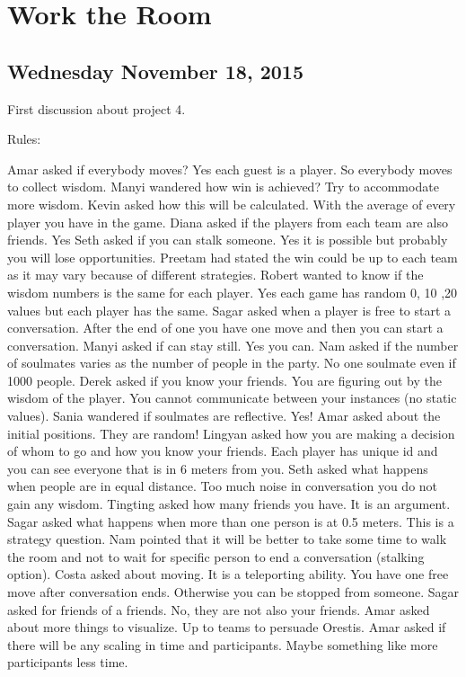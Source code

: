\section{Work the Room}
\subsection{Wednesday November 18, 2015}
First discussion about project 4.

Rules:

Amar asked if everybody moves? Yes each guest is a player. So everybody moves to 
collect wisdom.
Manyi wandered how win is achieved? Try to accommodate more wisdom.
Kevin asked how this will be calculated. With the average of every player you 
have in the game.
Diana asked if the players from each team are also friends. Yes
Seth asked if you can stalk someone. Yes it is possible but probably you will 
lose opportunities.
Preetam had stated the win could be up to each team as it may vary because 
of different strategies.
Robert wanted to know if the wisdom numbers is the same for each player. Yes each 
game has random {0, 10 ,20} values but each player has the same.
Sagar asked when a player is free to start a conversation. After the end of one 
you have one move and then you can start a conversation.
Manyi asked if can stay still. Yes you can.
Nam asked if the number of soulmates varies as the number of people in the party. 
No one soulmate even if 1000 people.
Derek asked if you know your friends. You are figuring out by the wisdom of the 
player. You cannot communicate between your instances (no static values). 
Sania wandered if soulmates are reflective. Yes!
Amar asked about the initial positions. They are random!
Lingyan asked how you are making a decision of whom to go and how you know your 
friends.
Each player has unique id and you can see everyone that is in 6 meters from you.
Seth asked what happens when people are in equal distance. Too much noise in 
conversation you do not gain any wisdom. 
Tingting asked how many friends you have. It is an argument.
Sagar asked what happens when more than one person is at 0.5 meters. This is a 
strategy question.
Nam pointed that it will be better to take some time to walk the room and not to 
wait for specific person to end a conversation (stalking option).
Costa asked about moving. It is a teleporting ability. You have one free move 
after conversation ends. Otherwise you can be stopped from someone. 
Sagar asked for friends of a friends. No, they are not also your friends.
Amar asked about more things to visualize. Up to teams to persuade Orestis.
Amar asked if there will be any scaling in time and participants. Maybe something 
like more participants less time.

